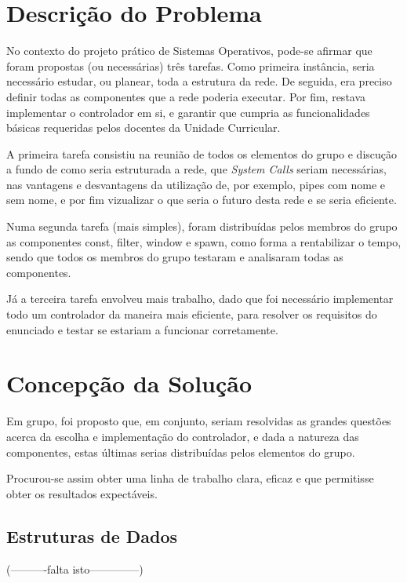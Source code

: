 \documentclass[a4paper]{article}
\begin{document}
\section{Descrição do Problema}
\label{sec:2}

\hspace{3mm} No contexto do projeto prático de Sistemas Operativos, pode-se afirmar que foram propostas (ou necessárias) três tarefas. Como primeira instância, seria necessário estudar, ou planear, toda a estrutura da rede. De seguida, era preciso definir todas as componentes que a rede poderia executar. Por fim, restava implementar o controlador em si, e garantir que cumpria as funcionalidades básicas requeridas pelos docentes da Unidade Curricular.
\par A primeira tarefa consistiu na reunião de todos os elementos do grupo e discução a fundo de como seria estruturada a rede, que \emph{System Calls} seriam necessárias, nas vantagens e desvantagens da utilização de, por exemplo, pipes com nome e sem nome, e por fim vizualizar o que seria o futuro desta rede e se seria eficiente.
\par Numa segunda tarefa (mais simples), foram distribuídas pelos membros do grupo as componentes const, filter, window e spawn, como forma a rentabilizar o tempo, sendo que todos os membros do grupo testaram e analisaram todas as componentes.
\par Já a terceira tarefa envolveu mais trabalho, dado que foi necessário implementar todo um controlador da maneira mais eficiente, para resolver os requisitos do enunciado e testar se estariam a funcionar corretamente.


\section{Concepção da Solução}
\label{sec:3}

\hspace{3mm} Em grupo, foi proposto que, em conjunto, seriam resolvidas as grandes questões acerca da escolha e implementação do controlador, e dada a natureza das componentes, estas últimas serias distribuídas pelos elementos do grupo.
\par Procurou-se assim obter uma linha de trabalho clara, eficaz e que permitisse obter os resultados expectáveis.


\subsection{Estruturas de Dados} (----------falta isto--------------)
\label{sec:4}
\end{document}
